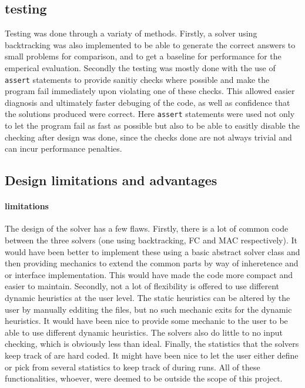 \documentclass[british]{article}
\newcommand{\code}[1]{\texttt{#1}}
\begin{document}
\subsection{testing}
Testing was done through a variaty of methods. Firstly, a solver using backtracking was also implemented to be able to generate the correct answers to small problems for comparison, and to get a baseline for performance for the emperical evaluation. Secondly the testing was mostly done with the use of \code{assert} statements to provide sanitiy checks where possible and make the program fail immediately upon violating one of these checks. This allowed easier diagnosis and ultimately faster debuging of the code, as well as confidence that the solutions produced were correct. Here \code{assert} statements were used not only to let the program fail as fast as possible but also to be able to easitly disable the checking after design was done, since the checks done are not always trivial and can incur performance penalties. 

\subsection{Design limitations and advantages} 
\paragraph{limitations}The design of the solver has a few flaws. Firstly, there is a lot of common code between the three solvers (one using backtracking, FC and MAC respectively). It would have been better to implement these using a basic abstract solver class and then providing mechanics to extend the common parts by way of inheretence and or interface implementation. This would have made the code more compact and easier to maintain. Secondly, not a lot of flexibility is offered to use different dynamic heuristics at the user level. The static heuristics can be altered by the user by manually edditing the files, but no such mechanic exits for the dynamic heuristics. It would have been nice to provide some mechanic to the user to be able to use different dynamic heuristics. The solvers also do little to no input checking, which is obviously less than ideal. Finally, the statistics that the solvers keep track of are hard coded. It might have been nice to let the user either define or pick from several statistics to keep track of during runs. All of these functionalities, whoever, were deemed to be outside the scope of this project. 
\end{document}
